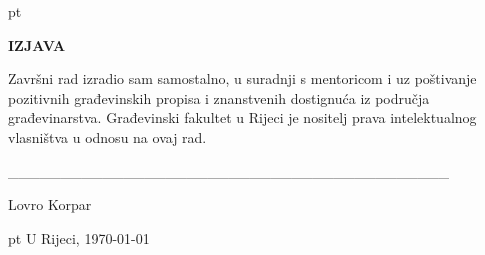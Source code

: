 


\newpage

\thispagestyle{empty}
\mbox{}
\thispagestyle{empty}

\newpage

\thispagestyle{empty}
\mbox{}
\thispagestyle{empty}


 pt

\begin{center}
{\fontsize{14pt}{16.8pt}\selectfont \textbf{IZJAVA}\par}\par
\end{center}\par

\vspace{\baselineskip}

\vspace{\baselineskip}
\begin{justify}
	\begin{onehalfspace}
Završni rad izradio sam samostalno, u suradnji s mentoricom i uz poštivanje pozitivnih građevinskih propisa i znanstvenih dostignuća iz područja građevinarstva. Građevinski fakultet u Rijeci je nositelj prava intelektualnog vlasništva u odnosu na ovaj rad. 
	\end{onehalfspace}

\end{justify}\par


\vspace{\baselineskip}

\vspace{\baselineskip}

\vspace{\baselineskip}
\_\_\_\_\_\_\_\_\_\_\_\_\_\_\_\_\_\_\_\_\_\_\_\_\_\_\_\_\_\_\_\_\_\_\_\_\_\_\_\_\_\_ \par

{Lovro Korpar}\par



 pt
U Rijeci, {\today}\par

\newpage

\thispagestyle{empty}
\mbox{}
\thispagestyle{empty}